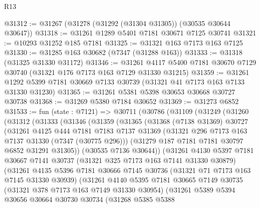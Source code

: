 \begin{lexlean}{R13}
\begin{coremodule}
@31312 := @31267 (@31278 (@31292 (@31304 @31305)) (@30535 @30644 @30647))
@31318 := @31261 @1289 @5401 @7181 @30671 @7125 @30741
@31321 := @10293 @31252 @185 @7181
@31325 := @31321 @163 @7173 @163 @7125
@31330 := @31285 @163 @30682 (@7347 (@31288 @163))
@31333 := @31318 (@31325 @31330 @31172)
@31346 := @31261 @4117 @5400 @7181 @30670 @7129 @30740 (@31321 @176 @7173 @163 @7129 @31330 @31215)
@31359 := @31261 @1292 @5399 @7181 @30669 @7133 @30739 (@31321 @41 @7173 @163 @7133 @31330 @31230)
@31365 := @31261 @5381 @5398 @30653 @30668 @30727 @30738
@31368 := @31269 @5380 @7184 @30652
@31369 := @31273 @6852
@31533 := fun (state : @7121) =>
  @30711
    (@30786
      (@31109
        (@31249
          (@31260
            (@31312
              (@31333
                (@31346
                  (@31359
                    (@31365
                      (@31368
                        (@7138 @31369)
                        @30727
                        (@31261
                          @4125
                          @444
                          @7181
                          @7183
                          @7137
                          @31369
                          (@31321 @296 @7173 @163 @7137 @31330 (@7347 (@30775 @296)))
                          (@31279 @187 @7181 @7181 @30797 @6852 @31291 @31305))
                        (@30535 @7136 @30644))
                      (@31261
                        @4130
                        @5397
                        @7181
                        @30667
                        @7141
                        @30737
                        (@31321 @325 @7173 @163 @7141 @31330 @30879)
                        (@31261
                          @4135
                          @5396
                          @7181
                          @30666
                          @7145
                          @30736
                          (@31321 @71 @7173 @163 @7145 @31330 @30939)
                          (@31261
                            @4140
                            @5395
                            @7181
                            @30665
                            @7149
                            @30735
                            (@31321 @378 @7173 @163 @7149 @31330 @30954)
                            (@31261
                              @5389
                              @5394
                              @30656
                              @30664
                              @30730
                              @30734
                              (@31268
                                @5385
                                @5388

\end{coremodule}
\end{lexlean}
